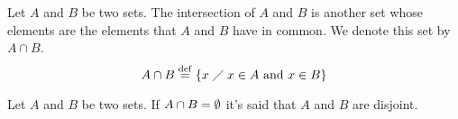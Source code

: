 
\begin{defi}
    Let $A$ and $B$ be two sets. The intersection of $A$ and $B$ is another set whose elements are the elements that $A$ and $B$ have in common. We denote this set by $A\cap B$.
    \begin{equation}
        A\cap B  \overset{\mathrm{def}}{=} \{x\;\diagup\; x\in A\textrm{ and } x\in B\}
    \end{equation}
\end{defi}


\begin{defi}
    Let $A$ and $B$ be two sets. If $A\cap B = \emptyset$ it's said that $A$ and $B$ are disjoint.
\end{defi}

